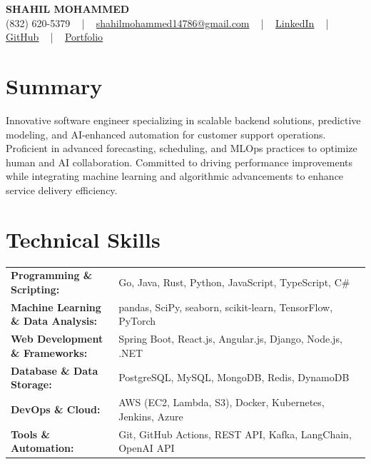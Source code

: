 \documentclass[letterpaper,11pt]{article}
\begin{document}
\begin{center}
    {\fontsize{14pt}{12pt}\selectfont \textbf{\MakeUppercase{Shahil Mohammed}}}\\ \vspace{2pt}
    \fontsize{10pt}{12pt}\selectfont (832) 620-5379 ~ | ~ \href{mailto:shahilmohammed14786@gmail.com}{shahilmohammed14786@gmail.com} ~ | ~  
    \href{https://www.linkedin.com/in/shahil-mohammed-9652931a1/}{\color{blue}\underline{LinkedIn}}  ~ | ~ 
    \href{https://github.com/freakbeast14}{\color{blue}\underline{GitHub}} ~ | ~ 
    \href{https://shahil-mohammed.netlify.app/}{\color{blue}\underline{Portfolio}}
    \vspace{-8pt}
\end{center}

\section{Summary}
\fontsize{9pt}{10pt}\selectfont
Innovative software engineer specializing in scalable backend solutions, predictive modeling, and AI-enhanced automation for customer support operations. Proficient in advanced forecasting, scheduling, and MLOps practices to optimize human and AI collaboration. Committed to driving performance improvements while integrating machine learning and algorithmic advancements to enhance service delivery efficiency.
 \vspace{-5pt}
 
\section{Technical Skills}
        \vspace{-14pt}
        \begin{table}[h]
            \fontsize{9pt}{10pt}\selectfont
            \begin{tabular}{p{0.3\linewidth} p{0.7\linewidth}}
                \textbf{Programming \& Scripting:} & Go, Java, Rust, Python, JavaScript, TypeScript, C\# \\
                \textbf{Machine Learning \& Data Analysis:} & pandas, SciPy, seaborn, scikit-learn, TensorFlow, PyTorch \\
                \textbf{Web Development \& Frameworks:} & Spring Boot, React.js, Angular.js, Django, Node.js, .NET \\
                \textbf{Database \& Data Storage:} & PostgreSQL, MySQL, MongoDB, Redis, DynamoDB \\
                \textbf{DevOps \& Cloud:} & AWS (EC2, Lambda, S3), Docker, Kubernetes, Jenkins, Azure \\
                \textbf{Tools \& Automation:} & Git, GitHub Actions, REST API, Kafka, LangChain, OpenAI API \\
            \end{tabular}
        \end{table}
 \vspace{-15pt}
 
\end{document}
